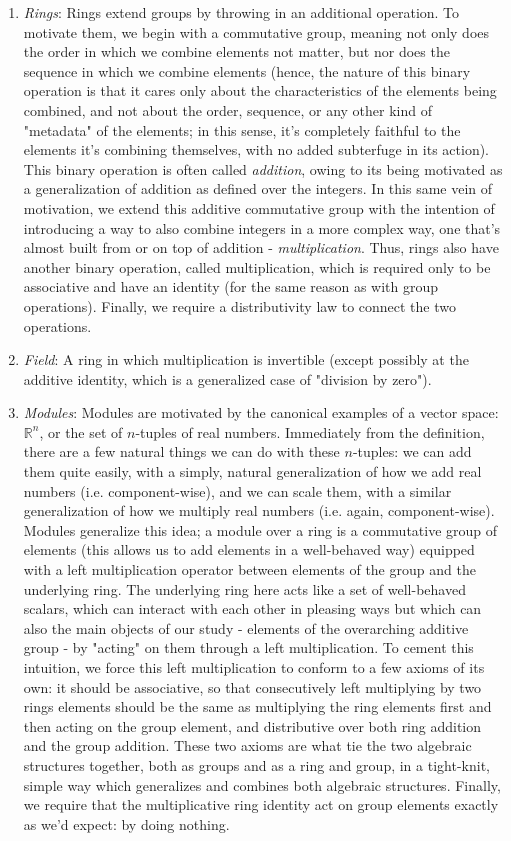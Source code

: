 \documentclass{article}
\newcommand{\R}{\mathbb{R}}
\begin{document}
\begin{enumerate}
    \item \textit{Rings}: Rings extend groups by throwing in an additional operation. To motivate them, we begin with a commutative group, meaning not only does the order in which we combine elements not matter, but nor does the sequence in which we combine elements (hence, the nature of this binary operation is that it cares only about the characteristics of the elements being combined, and not about the order, sequence, or any other kind of "metadata" of the elements; in this sense, it's completely faithful to the elements it's combining themselves, with no added subterfuge in its action). This binary operation is often called \textit{addition}, owing to its being motivated as a generalization of addition as defined over the integers. In this same vein of motivation, we extend this additive commutative group with the intention of introducing a way to also combine integers in a more complex way, one that's almost built from or on top of addition - \textit{multiplication}. Thus, rings also have another binary operation, called multiplication, which is required only to be associative and have an identity (for the same reason as with group operations). Finally, we require a distributivity law to connect the two operations.
    \item \textit{Field}: A ring in which multiplication is invertible (except possibly at the additive identity, which is a generalized case of "division by zero").
    \item \textit{Modules}: Modules are motivated by the canonical examples of a vector space: $ \R^n $, or the set of $ n $-tuples of real numbers. Immediately from the definition, there are a few natural things we can do with these $ n $-tuples: we can add them quite easily, with a simply, natural generalization of how we add real numbers (i.e. component-wise), and we can scale them, with a similar generalization of how we multiply real numbers (i.e. again, component-wise). Modules generalize this idea; a module over a ring is a commutative group of elements (this allows us to add elements in a well-behaved way) equipped with a left multiplication operator between elements of the group and the underlying ring. The underlying ring here acts like a set of well-behaved scalars, which can interact with each other in pleasing ways but which can also the main objects of our study - elements of the overarching additive group - by "acting" on them through a left multiplication. To cement this intuition, we force this left multiplication to conform to a few axioms of its own: it should be associative, so that consecutively left multiplying by two rings elements should be the same as multiplying the ring elements first and then acting on the group element, and distributive over both ring addition and the group addition. These two axioms are what tie the two algebraic structures together, both as groups and as a ring and group, in a tight-knit, simple way which generalizes and combines both algebraic structures. Finally, we require that the multiplicative ring identity act on group elements exactly as we'd expect: by doing nothing.

\end{enumerate}
\end{document}
